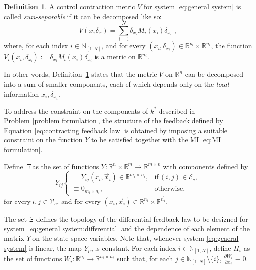 \documentclass[10pt,twocolumn,twoside]{IEEEtran}
\newcounter{para}
\newcommand\mypara{\par}
\theoremstyle{plain}
\theoremstyle{definition}
\newtheorem{definition}{Definition}
\theoremstyle{remark}
\begin{document}
\begin{definition}\label{def:SSCCM}
	A control contraction metric $V$ for system \eqref{eq:general system} is called \emph{sum-separable} if it can be decomposed like so:	\begin{equation*}
		V(x,\delta_x)=\sum_{i=1}^N \delta_{x_i}^\top M_i(x_i)\delta_{x_i}\;,
	\end{equation*}
	where, for each index $i\in\mathbb{N}_{[1,N]}$, and for every $(x_i,\delta_{x_i})\in\mathbb{R}^{n_i}\times\mathbb{R}^{n_i}$, the function $V_i(x_i,\delta_{x_i}):=\delta_{x_i}^\top M_i(x_i)\delta_{x_i}$ is a metric on $\mathbb{R}^{n_i}$.
\end{definition}

\mypara In other words, Definition~\ref{def:SSCCM} states that the metric $V$ on $\mathbb{R}^n$ can be  decomposed into a sum of smaller components, each of which depends only on the {\em local} information $x_i, \delta_{x_i}$.

\mypara To address the constraint on the components of $k^\ast$ described in Problem~\ref{problem formulation}, the structure of the feedback defined by Equation~\eqref{eq:contracting feedback law} is obtained by imposing a suitable constraint on the function $Y$ to be satisfied together with the MI \eqref{eq:MI formulation}. 

\mypara Define $\Xi$ as the set of functions $Y:\mathbb{R}^n\times\mathbb{R}^m\to\mathbb{R}^{m\times n}$ with components defined by
\begin{equation*}
		Y_{ij}\begin{cases}
		=Y_{ij}(x_i,\vec{x}_i)\in\mathbb{R}^{m_i\times n_i},&\text{if}\ (i,j)\in\mathscr{E}_c,\\
		\equiv0_{m_i\times n_i},&\text{otherwise},
		\end{cases}
\end{equation*}
for every $i,j\in\mathscr{V}_c$, and for every $(x_i,\vec{x}_i)\in\mathbb{R}^{n_i}\times\mathbb{R}^{\vec{n}_i}$.

\mypara The set $\Xi$ defines the topology of the differential feedback law to be designed for system~\eqref{eq:general system:differential} and the dependence of each element of the matrix $Y$ on the state-space variables. Note that, whenever system \eqref{eq:general system} is linear, the map $Y_{pq}$ is constant. For each index $i\in\mathbb{N}_{[1,N]}$, define $\Pi_i$ as the set of functions $W_i:\mathbb{R}^{n_i}\to\mathbb{R}^{n_i\times n_i}$ such that, for each $j\in\mathbb{N}_{[1,N]}\setminus\{i\}$, $\tfrac{\partial W_i}{\partial x_j}\equiv 0$.
\end{document}

